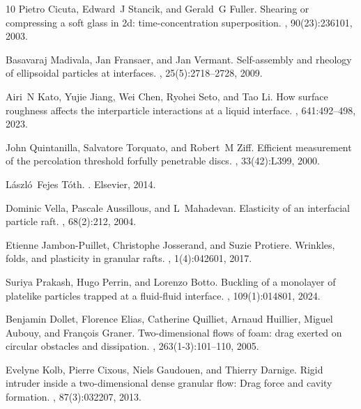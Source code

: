 \documentclass[twocolumn, prl,
 amsmath,amssymb,
 superscriptaddress,aps,
]{revtex4-2}
\begin{document}
\begin{thebibliography}{10}
	Pietro Cicuta, Edward~J Stancik, and Gerald~G Fuller.
	\newblock Shearing or compressing a soft glass in 2d: time-concentration
	superposition.
	, 90(23):236101, 2003.
	
	Basavaraj Madivala, Jan Fransaer, and Jan Vermant.
	\newblock Self-assembly and rheology of ellipsoidal particles at interfaces.
	, 25(5):2718--2728, 2009.
	
	Airi~N Kato, Yujie Jiang, Wei Chen, Ryohei Seto, and Tao Li.
	\newblock How surface roughness affects the interparticle interactions at a
	liquid interface.
	, 641:492--498, 2023.
	
	John Quintanilla, Salvatore Torquato, and Robert~M Ziff.
	\newblock Efficient measurement of the percolation threshold forfully
	penetrable discs.
	, 33(42):L399,
	2000.
	
	László~Fejes T{\'o}th.
	.
	\newblock Elsevier, 2014.
	
	Dominic Vella, Pascale Aussillous, and L~Mahadevan.
	\newblock Elasticity of an interfacial particle raft.
	, 68(2):212, 2004.
	
	Etienne Jambon-Puillet, Christophe Josserand, and Suzie Protiere.
	\newblock Wrinkles, folds, and plasticity in granular rafts.
	, 1(4):042601, 2017.
	
	Suriya Prakash, Hugo Perrin, and Lorenzo Botto.
	\newblock Buckling of a monolayer of platelike particles trapped at a
	fluid-fluid interface.
	, 109(1):014801, 2024.
	
	Benjamin Dollet, Florence Elias, Catherine Quilliet, Arnaud Huillier, Miguel
	Aubouy, and Fran{\c{c}}ois Graner.
	\newblock Two-dimensional flows of foam: drag exerted on circular obstacles and
	dissipation.
	, 263(1-3):101--110, 2005.
	
	Evelyne Kolb, Pierre Cixous, Niels Gaudouen, and Thierry Darnige.
	\newblock Rigid intruder inside a two-dimensional dense granular flow: Drag
	force and cavity formation.
	, 87(3):032207, 2013.
	

\end{thebibliography}
\end{document}
